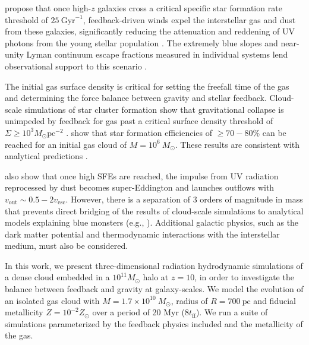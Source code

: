 \documentclass[twocolumn,linenumbers]{aastex631}
\begin{document}
\citet{2023MNRAS.522.3986F} propose that once high-$z$ galaxies cross a critical specific star formation rate threshold of $25 \ \mathrm{Gyr}^{-1}$, feedback-driven winds expel the interstellar gas and dust from these galaxies, significantly reducing the attenuation and reddening of UV photons from the young stellar population \citep{2023MNRAS.520.2445Z,2024A&A...684A.207F}. The extremely blue slopes and near-unity Lyman continuum escape fractions measured in individual systems lend observational support to this scenario \citep{2026arXiv260202322M, 2025OJAp....8E.125F, 2024ApJ...976..160H, 2025A&A...698A.234D,2023ApJ...955L..35S}. 

The initial gas surface density is critical for setting the freefall time of the gas and determining the force balance between gravity and stellar feedback. Cloud-scale simulations of star cluster formation show that gravitational collapse is unimpeded by feedback for gas past a critical surface density threshold of $\Sigma \geq 10^3 M_\odot \mathrm{pc^{-2}}$ \citep{2023MNRAS.521.5160M,2025ApJ...987...12M,2019MNRAS.483.5548G}. \cite{2023MNRAS.521.5160M} show that star formation efficiencies of $\geq 70-80\%$ can be reached for an initial gas cloud of $M =10^6\ M_\odot$. These results are consistent with analytical predictions \citep{2010ApJ...710L.142F,2018MNRAS.473.3717F,2019MNRAS.488.1501G}.

\cite{2023MNRAS.521.5160M} also show that once high SFEs are reached, the impulse from UV radiation reprocessed by dust becomes super-Eddington and launches outflows with $v_\mathrm{out} \sim 0.5-2 v_\mathrm{esc}$. However, there is a separation of 3 orders of magnitude in mass that prevents direct bridging of the results of cloud-scale simulations to analytical models explaining blue monsters (e.g., \citealt{2023MNRAS.523.3201D,2023MNRAS.522.3986F}). 
Additional galactic physics, such as the dark matter potential and thermodynamic interactions with the interstellar medium, must also be considered. 

In this work, we present three-dimensional radiation hydrodynamic simulations of a dense cloud embedded in a $10^{11} M_\odot$ halo at $z=10$, in order to investigate the balance between feedback and gravity at galaxy-scales. We model the evolution of an isolated gas cloud with $M = 1.7\times 10^{10}\ M_\odot$, radius of $R=700\ \mathrm{pc}$ and fiducial metallicity $Z=10^{-2}Z_\odot$ over a period of 20 Myr ($8t_\mathrm{ff}$). We run a suite of simulations parameterized by the feedback physics included and the metallicity of the gas.
\end{document}

